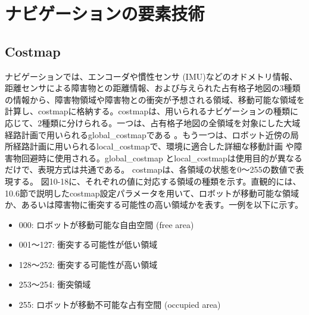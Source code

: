 \section{ナビゲーションの要素技術}

\subsection{Costmap}

ナビゲーションでは、エンコーダや慣性センサ (IMU)などのオドメトリ情報、距離センサによる障害物との距離情報、および与えられた占有格子地図の3種類の情報から、障害物領域や障害物との衝突が予想される領域、移動可能な領域を計算し、costmapに格納する。costmapは、用いられるナビゲーションの種類に応じて、2種類に分けられる。一つは、占有格子地図の全領域を対象にした大域経路計画で用いられるglobal\_costmapである  。もう一つは、ロボット近傍の局所経路計画に用いられるlocal\_costmapで、環境に適合した詳細な移動計画  や障害物回避時に使用される。global\_costmap とlocal\_costmapは使用目的が異なるだけで、表現方式は共通である。
costmapは、各領域の状態を0〜255の数値で表現する。  図10-18に、それぞれの値に対応する領域の種類を示す。直観的には、10.6節で説明したcostmap設定パラメータを用いて、ロボットが移動可能な領域か、あるいは障害物に衝突する可能性の高い領域かを表す。一例を以下に示す。

\begin{itemize}
\item 000: ロボットが移動可能な自由空間 (free area)
\item 001〜127: 衝突する可能性が低い領域
\item 128〜252: 衝突する可能性が高い領域
\item 253〜254: 衝突領域
\item 255: ロボットが移動不可能な占有空間 (occupied area)
\end{itemize}

